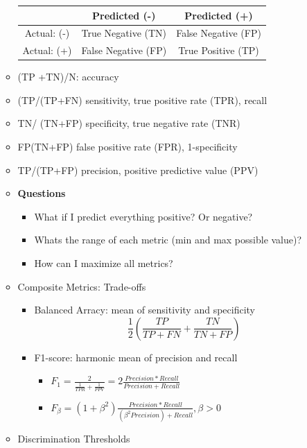 \documentclass[10pt, oneside]{article}
\begin{document}
\begin{itemize}
\begin{itemize}
        \begin{tabular}{|c|c|c|}
            \hline
             & Predicted (-) & Predicted (+)\\
             \hline
            Actual: (-) & True Negative (TN) & False Negative (FP) \\
            \hline
            Actual: (+) & False Negative (FP) & True Positive (TP)\\
            \hline
        \end{tabular}
        \item (TP +TN)/N: accuracy
        \item (TP/(TP+FN) sensitivity, true positive rate (TPR), recall
        \item TN/ (TN+FP) specificity, true negative rate (TNR)
        \item FP(TN+FP) false positive rate (FPR), 1-specificity
        \item TP/(TP+FP) precision, positive predictive value (PPV)
        \item \textbf{Questions}
        \begin{itemize}
            \item What if I predict everything positive? Or negative?
            \item Whats the range of each metric (min and max possible value)?
            \item How can I maximize all metrics?
        \end{itemize}
        \item Composite Metrics: Trade-offs
        \begin{itemize}
            \item Balanced Arracy: mean of sensitivity and specificity \[\frac{1}{2} \left(\frac{TP}{TP + FN} + \frac{TN}{TN+FP}\right)\]
            \item F1-score: harmonic mean of precision and recall
            \begin{itemize}
                \item $F_1 = \frac{2}{\frac{1}{TPR} + \frac{1}{PPV}} = 2\frac{Precision * Recall}{Precision + Recall}$
                \item $F_{\beta} = (1+\beta^2) \frac{Precision * Recall}{(\beta^2 Precision) + Recall}, \beta > 0$
            \end{itemize}
        \end{itemize}
        \item Discrimination Thresholds
        \begin{itemize}

\end{itemize}
\end{itemize}
\end{itemize}
\end{document}
